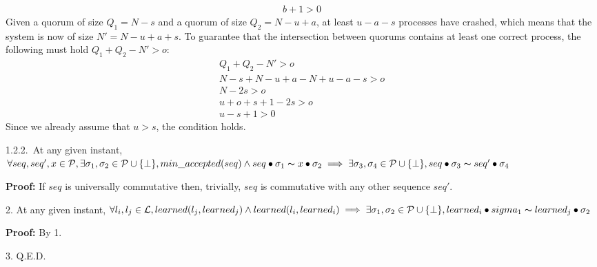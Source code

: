 {\begin{align*}
	b+1>0
\end{align*}
Given a quorum of size $Q_1=N-s$ and a quorum of size $Q_2=N-u+a$, at least $u-a-s$ processes have crashed, which means that the system is now of size $N'=N-u+a+s$. To guarantee that the intersection between quorums contains at least one correct process, the following must hold $Q_1+Q_2-N'>o$: 
\begin{align*}
	Q_1+Q_2-N'>o \\
	N-s+N-u+a-N+u-a-s>o\\
	N-2s>o\\
	u+o+s+1-2s>o\\
	u-s+1>0
\end{align*}
Since we already assume that $u>s$, the condition holds.}
\indent\indent\indent\indent\indent\parbox{\linewidth-\algorithmicindent*5}{\strut1.2.2.~At any given instant, $\forall seq,seq',x \in \mathcal{P},\exists \sigma_1,\sigma_2 \in \mathcal{P} \cup \{\bot\}, min\_accepted(seq) \land seq \bullet \sigma_1 \thicksim x \bullet \sigma_2  \implies \exists \sigma_3,\sigma_4 \in \mathcal{P} \cup \{\bot\}, seq \bullet \sigma_3 \thicksim seq' \bullet \sigma_4$} \par
\indent\indent\indent\indent\indent\indent\parbox{\linewidth-\algorithmicindent*6}{\strut\textbf{Proof:} If $seq$ is universally commutative then, trivially, $seq$ is commutative with any other sequence $seq'$.}
\indent\parbox{\linewidth-\algorithmicindent}{\strut2. At any given instant, $\forall l_i,l_j \in \mathcal{L}, learned(l_j,learned_j) \land learned(l_i,learned_i) \implies \exists \sigma_1,\sigma_2 \in \mathcal{P} \cup \{\bot\}, learned_i \bullet sigma_1 \thicksim learned_j \bullet \sigma_2$}\par
\indent\indent\parbox{\linewidth}{\strut\textbf{Proof:} By 1.}\par
\indent\parbox{\linewidth-\algorithmicindent}{\strut3. Q.E.D.} \par

